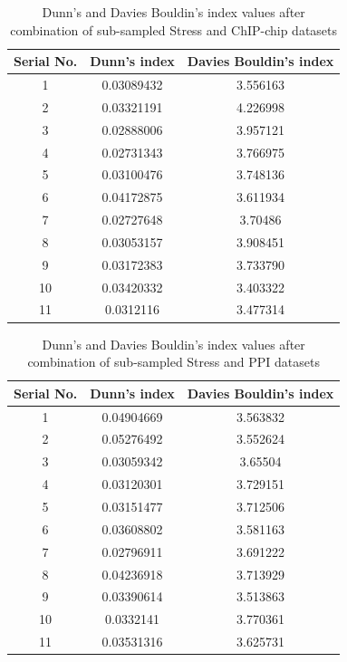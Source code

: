 \begin{table}[p]
\centering
\begin{tabular}{|c|c|c|}
\hline
Serial No. & Dunn's index  & Davies Bouldin's index\\
\hline
1 & 0.03089432 & 3.556163 \\
2 & 0.03321191 & 4.226998 \\
3 & 0.02888006 & 3.957121 \\
4 & 0.02731343 & 3.766975 \\
5 & 0.03100476 & 3.748136 \\
6 & 0.04172875 & 3.611934 \\
7 & 0.02727648 & 3.70486 \\
8 & 0.03053157 & 3.908451 \\
9 & 0.03172383 & 3.733790 \\
10 & 0.03420332 & 3.403322 \\
11 & 0.0312116 & 3.477314 \\
\hline 
\end{tabular}
\caption{Dunn's and Davies Bouldin's index values after combination of sub-sampled Stress and ChIP-chip datasets}
\label{tab:stress_chip_perturbed}
\end{table}


\begin{table}[p]
\centering
\begin{tabular}{|c|c|c|}
\hline
Serial No. & Dunn's index  & Davies Bouldin's index\\
\hline
1 & 0.04904669 & 3.563832 \\
2 & 0.05276492 & 3.552624 \\
3 & 0.03059342 & 3.65504 \\
4 & 0.03120301 & 3.729151 \\
5 & 0.03151477 & 3.712506 \\
6 & 0.03608802 & 3.581163 \\
7 & 0.02796911 & 3.691222 \\
8 & 0.04236918 & 3.713929 \\
9 & 0.03390614 & 3.513863 \\
10 & 0.0332141 & 3.770361 \\
11 & 0.03531316 & 3.625731 \\
\hline 
\end{tabular}
\caption{Dunn's and Davies Bouldin's index values after combination of sub-sampled Stress and PPI datasets}
\label{tab:stress_ppi_perturbed}
\end{table}

